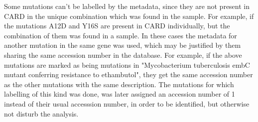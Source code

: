 Some mutations can't be labelled by the metadata, since they are not present in CARD in the unique combination which was found in the sample. 
For example, if the mutations A12D and Y16S are present in CARD individually, but the combination of them was found in a sample. In these cases the metadata for another mutation in the same gene was used, which may be justified by them sharing the same accession number in the database. 
For example, if the above mutations are marked as being mutations in "Mycobacterium tuberculosis embC mutant conferring resistance to ethambutol", they get the same accession number as the other mutations with the same description. 
The mutations for which labelling of this kind was done, was later assigned an accession number of 1 instead of their usual accesssion number, in order to be identified, but otherwise not disturb the analysis. 

